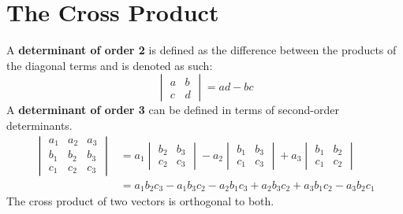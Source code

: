 \documentclass[../Calculus_\Roman{3}]{subfiles}
\begin{document}
			\section{The Cross Product}
				A \textbf{determinant of order 2} is defined as the difference between the products of the diagonal terms and is denoted as such:
					\[\begin{vmatrix} a & b \\ c & d \end{vmatrix} = ad - bc\]
					A \textbf{determinant of order 3} can be defined in terms of second-order determinants.
					\begin{align*}
						\begin{vmatrix} 
							a_1 & a_2 & a_3 \\ 
							b_1 & b_2 & b_3 \\ 
							c_1 & c_2 & c_3 
						\end{vmatrix} &=
						a_1\begin{vmatrix}
							b_2 & b_3 \\
							c_2 & c_3
						\end{vmatrix} -
						a_2\begin{vmatrix}
							b_1 & b_3 \\
							c_1 & c_3
						\end{vmatrix} +
						a_3\begin{vmatrix}
							b_1 & b_2 \\
							c_1 & c_2
						\end{vmatrix} \\
							&= a_1b_2c_3 - a_1b_3c_2 - a_2b_1c_3 + a_2b_3c_2 + a_3b_1c_2 - a_3b_2c_1
					\end{align*}
					The cross product of two vectors is orthogonal to both. \\
\end{document}
